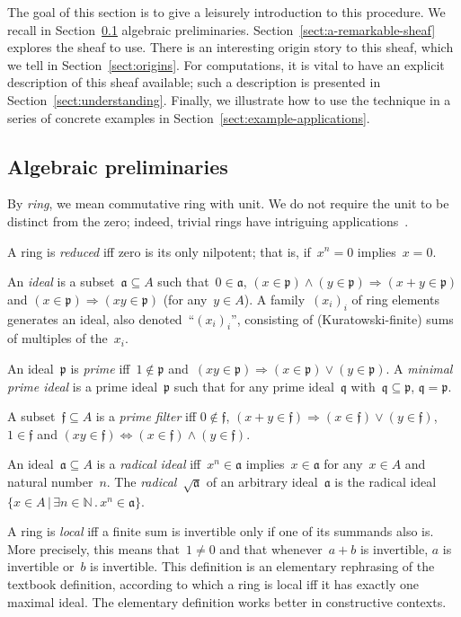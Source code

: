 \documentclass{ws-rv9x6}
\newcommand{\NN}{\mathbb{N}}
\newcommand{\aaa}{\mathfrak{a}}
\newcommand{\ppp}{\mathfrak{p}}
\newcommand{\qqq}{\mathfrak{q}}
\newcommand{\fff}{\mathfrak{f}}
\renewcommand{\_}{\mathpunct{.}}
\newcommand{\?}{\,{:}\,}
\begin{document}
The goal of this section is to give a leisurely introduction to this procedure.
We recall in Section~\ref{sect:algebraic-preliminaries} algebraic
preliminaries. Section~\ref{sect:a-remarkable-sheaf} explores the sheaf to use.
There is an interesting origin story to this sheaf, which we tell in
Section~\ref{sect:origins}. For computations, it is vital to have an explicit
description of this sheaf available; such a description is presented in
Section~\ref{sect:understanding}. Finally, we illustrate how to use the technique in
a series of concrete examples in Section~\ref{sect:example-applications}.


\subsection{Algebraic preliminaries}
\label{sect:algebraic-preliminaries}

By \emph{ring}, we mean commutative ring with unit. We do not require the unit
to be distinct from the zero; indeed, trivial rings have intriguing
applications~\cite{richman:trivial-rings}.

A ring is \emph{reduced} iff zero is its only nilpotent; that is, if~$x^n = 0$
implies~$x = 0$.

An \emph{ideal} is a subset~$\aaa \subseteq A$ such that~$0 \in \aaa$, $(x \in
\ppp) \wedge (y \in \ppp) \Rightarrow (x + y \in \ppp)$ and $(x \in
\ppp) \Rightarrow (xy \in \ppp)$ (for any~$y \in A$). A family~$(x_i)_i$ of
ring elements generates an ideal, also denoted~``$(x_i)_i$'', consisting of
(Kuratowski-finite) sums of multiples of the~$x_i$.

An ideal~$\ppp$ is \emph{prime} iff~$1 \not\in \ppp$ and~$(xy
\in \ppp) \Rightarrow (x \in \ppp) \vee (y \in \ppp)$.
A \emph{minimal prime ideal} is a prime ideal~$\ppp$ such that for any prime
ideal~$\qqq$ with~$\qqq \subseteq \ppp$, $\qqq = \ppp$.

A subset~$\fff \subseteq A$ is a \emph{prime filter} iff
$0 \not\in \fff$, $(x + y \in \fff) \Rightarrow (x \in \fff) \vee (y \in
\fff)$, $1 \in \fff$ and $(xy \in \fff) \Leftrightarrow (x \in \fff) \wedge (y
\in \fff)$.

An ideal~$\aaa \subseteq A$ is a \emph{radical ideal} iff~$x^n \in \aaa$
implies~$x \in \aaa$ for any~$x \in A$ and natural number~$n$. The
\emph{radical}~$\sqrt{\aaa}$ of an arbitrary ideal~$\aaa$ is the radical
ideal~$\{ x \in A \,|\, \exists n \in \NN\_ x^n \in \aaa \}$.

A ring is \emph{local} iff a finite sum is invertible only if one of its
summands also is. More precisely, this means that~$1 \neq 0$ and that
whenever~$a + b$ is invertible, $a$ is invertible or~$b$ is invertible.
This definition is an elementary rephrasing of the textbook definition,
according to which a ring is local iff it has exactly one maximal ideal. The
elementary definition works better in constructive contexts.
\end{document}
